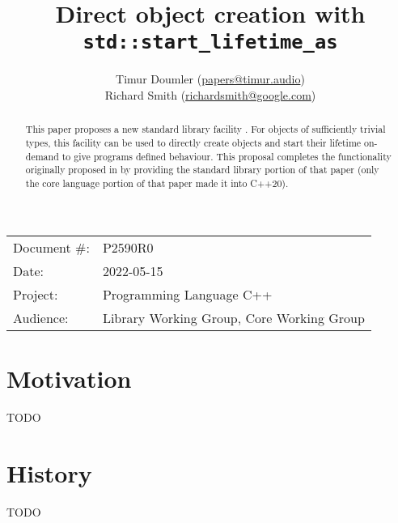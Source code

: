 

\newcommand{\forceindent}{\parindent=1em\indent\parindent=0pt\relax} %


\title{Direct object creation with \texttt{std::start_lifetime_as}}
\author{
  Timur Doumler \small(\href{mailto:papers@timur.audio}{papers@timur.audio}) \\
  Richard Smith \small(\href{mailto:richardsmith@google.com}{richardsmith@google.com})
}
\date{}
\maketitle

\begin{tabular}{ll}
Document \#: & P2590R0 \\
Date: & 2022-05-15\\
Project: & Programming Language C++ \\
Audience: & Library Working Group, Core Working Group
\end{tabular}


\begin{abstract}
This paper proposes a new standard library facility . For objects of sufficiently trivial types, this facility can be used to directly create objects and start their lifetime on-demand to give programs defined behaviour. This proposal completes the functionality originally proposed in \cite{P0593R6} by providing the standard library portion of that paper (only the core language portion of that paper made it into C++20).
\end{abstract}

\vspace{5mm}

\section{Motivation}
\label{sec:motivation}

TODO


\section{History}
\label{sec:history}

TODO


